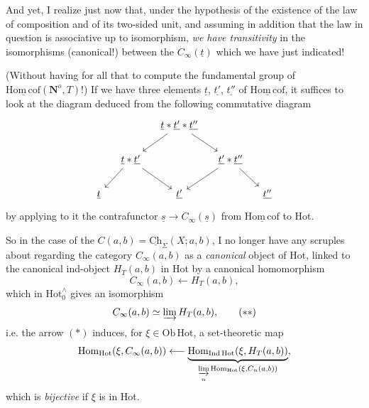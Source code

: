 \documentclass[11pt]{article}
\newcommand{\msp}[1]{\marginpar{\footnotesize [#1]}}
\newcommand{\Hot}{\mathrm{Hot}}
\newcommand{\Hotz}{\mathrm{Hot}_0^{\wedge}}
\newcommand{\Hc}{\underline{\mathrm{Hom\,cof}}}
\newcommand{\Nop}{\mathbf{N}^o}
\begin{document}
And yet, I realize just now that, under the hypothesis of the existence of the law of composition and of its two-sided unit, and assuming in addition that the law in question is associative up to isomorphism, \textit{we have transitivity} in the isomorphisms (canonical!) between the $C_\infty(\underline{t})$ which we have just indicated!

\msp{page 120}
(Without having for all that to compute the fundamental group of $\Hc(\Nop, T)$!) If we have three elements $\underline{t}$, $\underline{t'}$, $\underline{t''}$ of $\Hc$, it suffices to look at the diagram deduced from the following commutative diagram
\[
\begin{tikzcd}[column sep=small]
 & & \underline{t} * \underline{t'} * \underline{t''} \arrow[ld] \arrow[rd] & & \\
 & \underline{t} * \underline{t'} \arrow[ld] \arrow[rd] & & \underline{t'} * \underline{t''} \arrow[ld] \arrow[rd] & \\
\underline{t} & & \underline{t'} & & \underline{t''}
\end{tikzcd}
\]
by applying to it the contrafunctor $\underline{s} \longrightarrow C_\infty(\underline{s})$ from $\Hc$ to Hot.

So in the case of the $C(a,b) = \underline{\mathrm{Ch}}_\Sigma(X; a, b)$, I no longer have any scruples about regarding the category $C_\infty(a,b)$ as a \textit{canonical} object of Hot, linked to the canonical ind-object $H_T(a,b)$ in Hot by a canonical homomorphism
\[
C_\infty(a,b) \longleftarrow H_T(a,b), \tag*{$(*)$}
\]
which in $\Hotz$ gives an isomorphism
\[
C_\infty(a,b) \simeq \varinjlim H_T(a,b), \tag*{$(**)$}
\]
i.e. the arrow $(*)$ induces, for $\xi \in \mathrm{Ob}\,\Hot$, a set-theoretic map
\[
\mathrm{Hom}_{\Hot}(\xi, C_\infty(a,b)) \longleftarrow \underbrace{\mathrm{Hom}_{\mathrm{Ind}\,\Hot}(\xi, H_T(a,b))}_{\underset{n}{\varinjlim}\, \mathrm{Hom}_{\Hot}(\xi, C_n(a,b))},
\]
which is \textit{bijective} if $\xi$ is in Hot.
\end{document}
